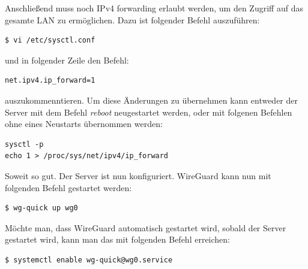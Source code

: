 Anschließend muss noch IPv4 forwarding erlaubt werden, um den Zugriff auf das gesamte LAN zu ermöglichen.
Dazu ist folgender Befehl auszuführen:
\begin{lstlisting}
$ vi /etc/sysctl.conf
\end{lstlisting}
und in folgender Zeile den Befehl:
\begin{lstlisting}
net.ipv4.ip_forward=1
\end{lstlisting}
auszukommenntieren. \newline\newline
Um diese Änderungen zu übernehmen kann entweder der Server mit dem Befehl \textit{reboot} neugestartet werden, oder mit folgenen Befehlen ohne eines Neustarts übernommen werden:
\begin{lstlisting}
sysctl -p
echo 1 > /proc/sys/net/ipv4/ip_forward
\end{lstlisting} \noindent
Soweit so gut. Der Server ist nun konfiguriert. \newline\newline
WireGuard kann nun mit folgenden Befehl gestartet werden:
\begin{lstlisting}
$ wg-quick up wg0
\end{lstlisting}
Möchte man, dass WireGuard automatisch gestartet wird, sobald der Server gestartet wird, kann man das mit folgenden Befehl erreichen:
\begin{lstlisting}
$ systemctl enable wg-quick@wg0.service 
\end{lstlisting}
\newpage
